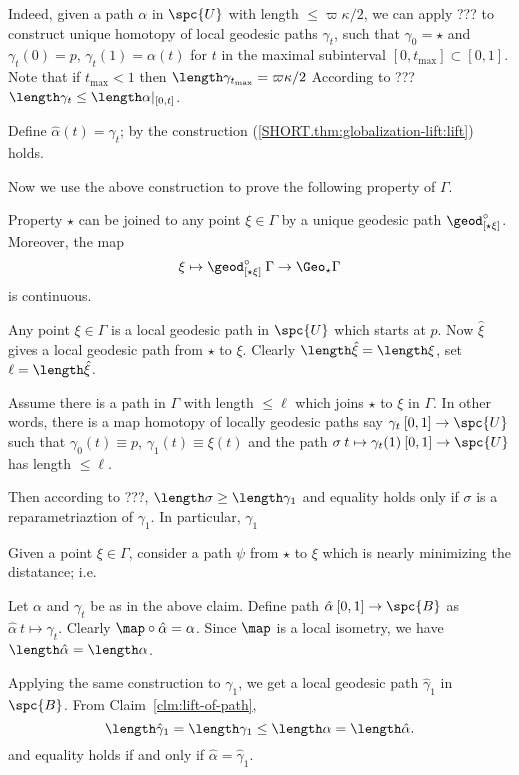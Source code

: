 Indeed, given a path $\alpha$ in $\spc{U}$ with length $\le\varpi\kappa/2$,
we can apply ??? to construct unique homotopy of local geodesic paths $\gamma_t$, such that $\gamma_0=\star$ and
$\gamma_t(0)=p$, $\gamma_t(1)=\alpha(t)$ for $t$ in the maximal subinterval $[0,t_{\max}]\subset [0,1]$.
Note that if $t_{\max}<1$ then $\length\gamma_{t_{\max}}=\varpi\kappa/2$
According to ??? $\length\gamma_t\le\length\alpha|_{[0,t]}$.

Define $\hat\alpha(t)=\gamma_t$; by the construction (\ref{SHORT.thm:globalization-lift:lift}) holds.

\medskip

Now we use the above construction to prove the following property of $\Gamma$.

\begin{clm}{Property}
$\star$ can be joined to any point $\xi\in\Gamma$ by a unique geodesic path $\geod^\circ_{[\star\xi]}$.
Moreover, the map 
$$\xi\mapsto\geod^\circ_{[\star\xi]}\:\Gamma\to\Geo_\star\Gamma$$
is continuous. 
\end{clm}

Any point $\xi\in\Gamma$ is a local geodesic path in $\spc{U}$ which starts at $p$.
Now $\hat\xi$ gives a local geodesic path from $\star$ to $\xi$.
Clearly $\length\hat\xi=\length\xi$,
set $\ell=\length\hat\xi$.

Assume there is a path in $\Gamma$ with length $\le\ell$
which joins $\star$ to $\xi$ in $\Gamma$.
In other words, there is a map homotopy of locally geodesic paths say $\gamma_t\:[0,1]\to\spc{U}$ such that 
$\gamma_0(t)\equiv p$, $\gamma_1(t)\equiv\xi(t)$
and the path $\sigma\:t\mapsto\gamma_t(1)\:[0,1]\to\spc{U}$ 
has length $\le \ell$.

Then according to ???, $\length\sigma\ge\length\gamma_1$ and equality holds only if $\sigma$ is a reparametriaztion of $\gamma_1$.
In particular, $\gamma_1$




Given a point $\xi\in\Gamma$,
consider a path $\psi$ from $\star$ to $\xi$ which is nearly minimizing the distatance; i.e.

Let $\alpha$ and $\gamma_t$ be as in the above claim.
Define path $\hat\alpha\:[0,1]\to \spc{B}$ as $\hat\alpha\:t\mapsto \gamma_t$.
Clearly $\map\circ\hat\alpha=\alpha$.
Since $\map$ is a local isometry, we have $\length\hat\alpha=\length\alpha$.

Applying the same construction to $\gamma_1$, we get a local geodesic path $\hat\gamma_1$ in $\spc{B}$.
From Claim~\ref{clm:lift-of-path},
$$\length\hat\gamma_1
=
\length\gamma_1
\le
\length\alpha
=
\length\hat\alpha.$$
and equality holds if and only if $\hat\alpha=\hat\gamma_1$.

